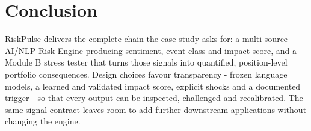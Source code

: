 \documentclass[11pt,a4paper]{article}
\begin{document}
\section{Conclusion}
RiskPulse delivers the complete chain the case study asks for: a multi-source AI/NLP Risk Engine producing sentiment, event class and impact score, and a Module B stress tester that turns those signals into quantified, position-level portfolio consequences. Design choices favour transparency - frozen language models, a learned and validated impact score, explicit shocks and a documented trigger - so that every output can be inspected, challenged and recalibrated. The same signal contract leaves room to add further downstream applications without changing the engine.
\end{document}
